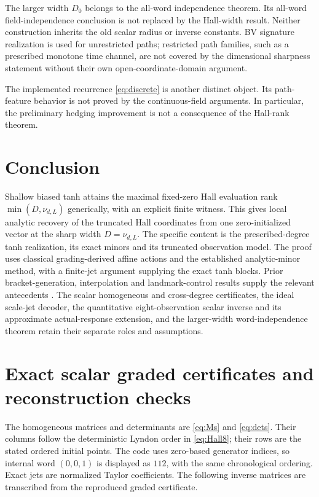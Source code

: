 \documentclass[11pt,a4paper]{article}
\numberwithin{equation}{section}
\theoremstyle{definition}
\theoremstyle{remark}
\begin{document}
The larger width $D_0$ belongs to the all-word independence theorem.
Its all-word field-independence conclusion is not replaced by the Hall-width
result. Neither construction inherits the old scalar radius or inverse
constants. BV signature realization is used for unrestricted paths;
restricted path families, such as a prescribed monotone time channel,
are not covered by the dimensional sharpness statement without their
own open-coordinate-domain argument.

The implemented recurrence \eqref{eq:discrete} is another distinct
object. Its path-feature behavior is not proved by the continuous-field
arguments. In particular, the preliminary hedging improvement is not
a consequence of the Hall-rank theorem.

\section{Conclusion}
Shallow biased tanh attains the maximal fixed-zero Hall evaluation rank
$\min(D,\nu_{d,L})$ generically, with an explicit finite witness.
This gives local analytic recovery of the truncated Hall coordinates
from one zero-initialized vector at the sharp width
$D=\nu_{d,L}$. The specific content is the prescribed-degree tanh
realization, its exact minors and its truncated observation model.
The proof uses classical grading-derived affine actions and the
established analytic-minor method, with a finite-jet argument supplying
the exact tanh blocks. Prior bracket-generation, interpolation and
landmark-control results supply the relevant antecedents
\cite{MonzioCompagnoni,CuchieroLarssonTeichmann,GrongVegaMolino}.
The scalar homogeneous and cross-degree certificates, the ideal
scale-jet decoder, the quantitative eight-observation scalar inverse
and its approximate actual-response extension, and the larger-width
word-independence theorem retain their separate roles and assumptions.

\appendix
\section{Exact scalar graded certificates and reconstruction checks}
\label{app:graded}
The homogeneous matrices and determinants are \eqref{eq:Ms} and
\eqref{eq:dets}. Their columns follow the deterministic Lyndon order in
\eqref{eq:Hall8}; their rows are the stated ordered initial points.
The code uses zero-based generator indices, so internal word $(0,0,1)$
is displayed as $112$, with the same chronological ordering. Exact jets
are normalized Taylor coefficients. The following inverse matrices are
transcribed from the reproduced graded certificate.
\end{document}
